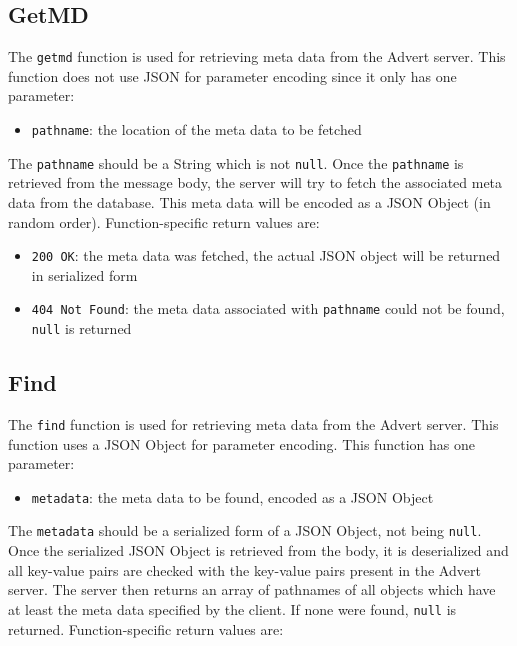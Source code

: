 \documentclass[a4paper,10pt]{article}
\begin{document}
\subsection{GetMD}
\label{getmd}
The \texttt{getmd} function is used for retrieving meta data from the Advert
server. This function does not use JSON for parameter encoding since it only has
one
parameter:

\begin{itemize}
  \item \texttt{pathname}: the location of the meta data to be fetched
\end{itemize}

The \texttt{pathname} should be a String which is not \texttt{null}. Once the
\texttt{pathname} is retrieved from the message body, the server will try to
fetch the associated meta data from the database. This meta data will be
encoded as a JSON Object (in random order). Function-specific return values are:

\begin{itemize}
  \item \texttt{200 OK}: the meta data was fetched, the actual JSON object will
  be returned in serialized form
  \item \texttt{404 Not Found}: the meta data associated with \texttt{pathname}
  could not be found, \texttt{null} is returned
\end{itemize}

\subsection{Find}
\label{find}
The \texttt{find} function is used for retrieving meta data from the Advert
server. This function uses a JSON Object for parameter encoding. This function
has one parameter:

\begin{itemize}
  \item \texttt{metadata}: the meta data to be found, encoded as a JSON Object
\end{itemize}

The \texttt{metadata} should be a serialized form of a JSON Object, not being
\texttt{null}. Once the serialized JSON Object is retrieved from the body, it
is deserialized and all key-value pairs are checked with the key-value pairs
present in the Advert server. The server then returns an array of
pathnames of all objects which have at least the meta data specified by the
client. If none were found, \texttt{null} is returned. Function-specific return
values are:
\end{document}
